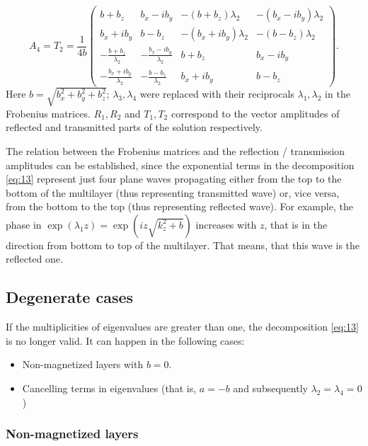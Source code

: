 \documentclass[12pt,a4paper]{article}
\begin{document}
\begin{equation}
A_4 = T_2
= \frac{1}{4 b}
\left(
\begin{matrix}
    b + b_z	&	b_x - i b_y	&	-(b + b_z) \lambda_2	&	-(b_x - i b_y) \lambda_2 \\
    b_x + i b_y	&	b - b_z	&	-(b_x + i b_y) \lambda_2	&	-(b - b_z) \lambda_2 \\
	-\frac{b + b_z}{\lambda_2}	&	-\frac{b_x - i b_y}{\lambda_2}	&	b + b_z	&	b_x - i b_y \\
	-\frac{b_x + i b_y}{\lambda_2}	&	-\frac{b - b_z}{\lambda_2}	&	b_x + i b_y	&	b - b_z
\end{matrix}
\right).
\end{equation}
Here $b = \sqrt{b_x^2 + b_y^2 + b_z^2}$; $\lambda_3, \lambda_4$ were replaced with their reciprocals $\lambda_1, \lambda_2$ in the Frobenius matrices. $R_1, R_2$ and $T_1, T_2$ correspond to the vector amplitudes of reflected and transmitted parts of the solution respectively.

The relation between the Frobenius matrices and the reflection / transmission amplitudes can be established, since the exponential terms in the decomposition \ref{eq:13} represent just four plane waves propagating either from the top to the bottom of the multilayer (thus representing transmitted wave) or, vice versa, from the bottom to the top (thus representing reflected wave). For example, the phase in $\exp{(\lambda_1 z)} = \exp{(i z \sqrt{k_z^2 + b})}$ increases with $z$, that is in the direction from bottom to top of the multilayer. That means, that this wave is the reflected one. 

\subsection{Degenerate cases}

If the multiplicities of eigenvalues are greater than one, the decomposition \ref{eq:13} is no longer valid. It can happen in the following
cases:

\begin{itemize}
\item Non-magnetized layers with $b = 0$.
\item Cancelling terms in eigenvalues (that is, $a = -b$ and subsequently $\lambda_{2} = \lambda_{4} = 0$)
\end{itemize}

\subsubsection{Non-magnetized layers}
\end{document}
